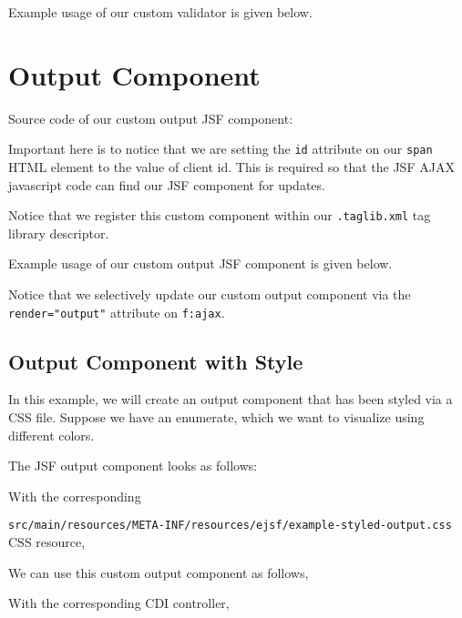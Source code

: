 Example usage of our custom validator is given below.


\section{Output Component}

Source code of our custom output JSF component:

Important here is to notice that we are setting the \texttt{id} attribute on our \texttt{span} HTML element to the value of client id.
This is required so that the JSF AJAX javascript code can find our JSF component for updates.

Notice that we register this custom component within our \texttt{.taglib.xml} tag library descriptor.

Example usage of our custom output JSF component is given below.

Notice that we selectively update our custom output component via the \texttt{render="output"} attribute on \texttt{f:ajax}.

\subsection{Output Component with Style}

In this example, we will create an output component that has been styled via a CSS file.
Suppose we have an enumerate, which we want to visualize using different colors.


The JSF output component looks as follows:


With the corresponding

\texttt{src/main/resources/META-INF/resources/ejsf/example-styled-output.css} CSS resource,


We can use this custom output component as follows,


With the corresponding CDI controller,



